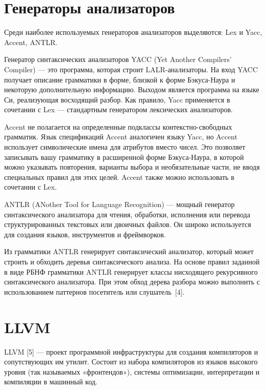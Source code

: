 \section{Генераторы анализаторов}

Среди наиболее используемых генераторов анализаторов выделяются: Lex и Yacc, Accent, ANTLR.

Генератор синтаксических анализаторов YACC (Yet Another Compilers' Compiler) — это программа, которая строит LALR-анализаторы.
На вход YACC получает описание грамматики в форме, близкой к форме Бэкуса-Наура и некоторую дополнительную информацию.
Выходом является программа на языке Си, реализующая восходящий разбор.
Как правило, Yacc применяется в сочетании с Lex — стандартным генератором лексических анализаторов.

Accent не полагается на определенные подклассы контекстно-свободных грамматик.
Язык спецификаций Accent аналогичен языку Yacc, но Accent использует символические имена для атрибутов вместо чисел.
Это позволяет записывать вашу грамматику в расширенной форме Бэкуса-Наура, в которой можно указывать повторения, варианты выбора и необязательные части, не вводя специальных правил для этих целей.
Accent также можно использовать в сочетании с Lex.

ANTLR (ANother Tool for Language Recognition) — мощный генератор синтаксического анализатора для чтения, обработки, исполнения или перевода структурированных текстовых или двоичных файлов.
Он широко используется для создания языков, инструментов и фреймворков.

Из грамматики ANTLR генерирует синтаксический анализатор, который может строить и обходить деревья синтаксического анализа.
На основе правил заданной в виде РБНФ грамматики ANTLR генерирует классы нисходящего рекурсивного синтаксического анализатора.
При этом обход дерева разбора можно выполнить с использованием паттернов посетитель или слушатель~[4].


\section{LLVM}

LLVM [5] — проект программной инфраструктуры для создания компиляторов и сопутствующих им утилит.
Состоит из набора компиляторов из языков высокого уровня (так называемых «фронтендов»), системы оптимизации, интерпретации и компиляции в машинный код.

